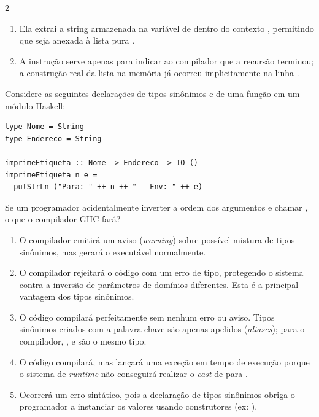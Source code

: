 \documentclass[a4paper,10pt,brazil]{article}
\begin{document}
\begin{multicols}{2}
\begin{enumerate}
  \item Ela extrai a string armazenada na variável  de dentro do contexto , permitindo que seja anexada à lista pura .

  \item A instrução  serve apenas para indicar ao compilador que a recursão terminou; a construção real da lista na memória já ocorreu implicitamente na linha .


\end{enumerate}

Considere as seguintes declarações de tipos sinônimos e de uma função em um módulo Haskell:

\begin{verbatim}
type Nome = String
type Endereco = String

imprimeEtiqueta :: Nome -> Endereco -> IO ()
imprimeEtiqueta n e =
  putStrLn ("Para: " ++ n ++ " - Env: " ++ e)
\end{verbatim}

Se um programador acidentalmente inverter a ordem dos argumentos e chamar , o que o compilador GHC fará?

\begin{enumerate}
  \item O compilador emitirá um aviso (\emph{warning}) sobre possível mistura de tipos sinônimos, mas gerará o executável normalmente.

  \item O compilador rejeitará o código com um erro de tipo, protegendo o sistema contra a inversão de parâmetros de domínios diferentes. Esta é a principal vantagem dos tipos sinônimos.

  \item O código compilará perfeitamente sem nenhum erro ou aviso. Tipos sinônimos criados com a palavra-chave  são apenas apelidos (\emph{aliases}); para o compilador, ,  e  são o mesmo tipo.

  \item O código compilará, mas lançará uma exceção em tempo de execução porque o sistema de \emph{runtime} não conseguirá realizar o \emph{cast} de  para .

  \item Ocorrerá um erro sintático, pois a declaração de tipos sinônimos obriga o programador a instanciar os valores usando construtores (ex: ).



\end{enumerate}
\end{multicols}
\end{document}
